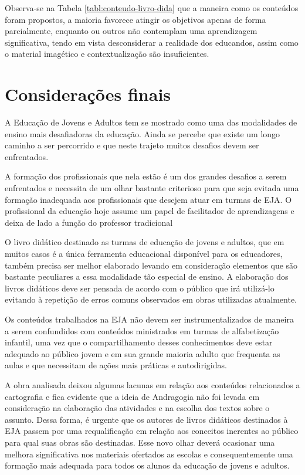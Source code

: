 \begin{refsection}
    Observa-se na Tabela \ref{tabl:conteudo-livro-dida} que a maneira como os conteúdos foram propostos, a maioria favorece atingir os objetivos apenas de forma parcialmente, enquanto ou outros não contemplam uma aprendizagem significativa, tendo em vista desconsiderar a realidade dos educandos, assim como o material imagético e contextualização são insuficientes. 


    \section{Considerações finais}

    A Educação de Jovens e Adultos tem se mostrado como uma das modalidades de ensino mais desafiadoras da educação. Ainda se percebe que existe um longo caminho a ser percorrido e que neste trajeto muitos desafios devem ser enfrentados. 

    A formação dos profissionais que nela estão é um dos grandes desafios a serem enfrentados e necessita de um olhar bastante criterioso para que seja evitada uma formação inadequada aos profissionais que desejem atuar em turmas de EJA. O profissional da educação hoje assume um papel de facilitador de aprendizagens e deixa de lado a função do professor tradicional 

    O livro didático destinado as turmas de educação de jovens e adultos, que em muitos casos é a única ferramenta educacional disponível para os educadores, também precisa ser melhor elaborado levando em consideração elementos que são bastante peculiares a essa modalidade tão especial de ensino. A elaboração dos livros didáticos deve ser pensada de acordo com o público que irá utilizá-lo evitando à repetição de erros comuns observados em obras utilizadas atualmente. 

    Os conteúdos trabalhados na EJA não devem ser instrumentalizados de maneira a serem confundidos com conteúdos ministrados em turmas de alfabetização infantil, uma vez que o compartilhamento desses conhecimentos deve estar adequado ao público jovem e em sua grande maioria adulto que frequenta as aulas e que necessitam de ações mais práticas e autodirigidas. 

    A obra analisada deixou algumas lacunas em relação aos conteúdos relacionados a cartografia e fica evidente que a ideia de Andragogia não foi levada em consideração na elaboração das atividades e na escolha dos textos sobre o assunto. Dessa forma, é urgente que os autores de livros didáticos destinados à EJA passem por uma requalificação em relação aos conceitos inerentes ao público para qual suas obras são destinadas. Esse novo olhar deverá ocasionar uma melhora significativa nos materiais ofertados as escolas e consequentemente uma formação mais adequada para todos os alunos da educação de jovens e adultos.  

    \printbibliography[heading=subbibliography,notcategory=fullcited]

    \label{chap:alfabetizacao-cartogend}

\end{refsection}
